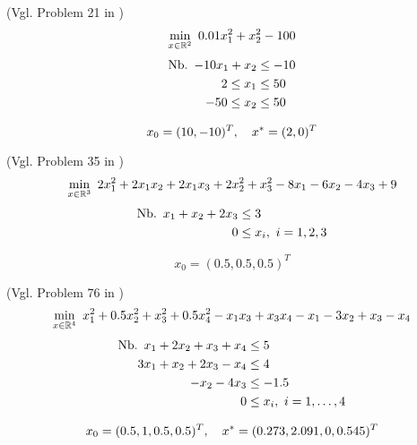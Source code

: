 \begin{testproblem}
(Vgl. Problem 21 in \cite[S.~44]{hock})
\begin{equation}
\min_{x\in\mathbb{R}^2}\ 0.01 x_1^2 + x_2^2 - 100
\end{equation}
\begin{equation*}
\begin{split}
\nb -10 x_1 + x_2 & \leq -10 \\
2 \leq x_1 & \leq 50 \\
-50 \leq x_2 & \leq 50 \\
\end{split}
\end{equation*}

\begin{equation*}
x_0 = (10, -10)^T,\quad x^* = (2, 0)^T
\end{equation*}
\end{testproblem}

\begin{testproblem}
(Vgl. Problem 35 in \cite[S.~58]{hock})
\begin{equation}
\min_{x\in\mathbb{R}^3}\ 2 x_1^2 + 2 x_1 x_2 + 2 x_1 x_3 + 2 x_2^2 + x_3^2 - 8 x_1 - 6 x_2 - 4 x_3 + 9
\end{equation}
\begin{equation*}
\begin{split}
\nb x_1 + x_2 + 2 x_3 & \leq 3 \\
0 & \leq x_i,\ i = 1,2,3 \\
\end{split}
\end{equation*}

\begin{equation*}
x_0 = (0.5, 0.5, 0.5)^T
\end{equation*}
\end{testproblem}

\begin{testproblem}
(Vgl. Problem 76 in \cite[S.~96]{hock})
\begin{equation}
\min_{x\in\mathbb{R}^4}\ x_1^2 + 0.5 x_2^2 + x_3^2 + 0.5 x_4^2 - x_1 x_3 + x_3 x_4 - x_1 - 3 x_2 + x_3 - x_4
\end{equation}
\begin{equation*}
\begin{split}
\nb x_1 + 2 x_2 + x_3 + x_4 & \leq 5 \\
3 x_1 + x_2 + 2 x_3 - x_4 & \leq 4 \\
-x_2 - 4 x_3 & \leq -1.5 \\
0 & \leq x_i,\ i = 1,\ldots,4 \\
\end{split}
\end{equation*}

\begin{equation*}
x_0 = (0.5, 1, 0.5, 0.5)^T,\quad x^* = (0.273, 2.091, 0, 0.545)^T
\end{equation*}
\end{testproblem}
